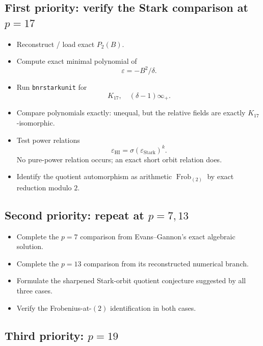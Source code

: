 \documentclass[11pt,reqno]{amsart}
\theoremstyle{plain}
\begin{document}
\subsection{\texorpdfstring{First priority: verify the Stark comparison at \(p=17\)}{First priority: verify the Stark comparison at p=17}}\label{sec:18.1}

\begin{itemize}
\item[$\boxtimes$] Reconstruct / load exact \(P_2(B)\).
\item[$\boxtimes$] Compute exact minimal polynomial of
\[
\varepsilon=-B^2/\delta.
\]
\item[$\boxtimes$] Run \texttt{bnrstarkunit} for
\[
K_{17},\quad(\delta-1)\infty_+.
\]
\item[$\boxtimes$] Compare polynomials exactly: unequal, but the relative fields are exactly \(K_{17}\)-isomorphic.
\item[$\boxtimes$] Test power relations
\[
\varepsilon_{\mathrm{HI}}=\sigma(\varepsilon_{\mathrm{Stark}})^k.
\]
No pure-power relation occurs; an exact short orbit relation does.
\item[$\boxtimes$] Identify the quotient automorphism as arithmetic \(\operatorname{Frob}_{(2)}\) by exact reduction modulo \(2\).
\end{itemize}

\subsection{\texorpdfstring{Second priority: repeat at \(p=7,13\)}{Second priority: repeat at p=7,13}}\label{sec:18.2}

\begin{itemize}
\item[$\boxtimes$] Complete the \(p=7\) comparison from Evans--Gannon's exact algebraic solution.
\item[$\boxtimes$] Complete the \(p=13\) comparison from its reconstructed numerical branch.
\item[$\boxtimes$] Formulate the sharpened Stark-orbit quotient conjecture suggested by all three cases.
\item[$\boxtimes$] Verify the Frobenius-at-\((2)\) identification in both cases.
\end{itemize}

\subsection{\texorpdfstring{Third priority: \(p=19\)}{Third priority: p=19}}\label{sec:18.3}
\end{document}
